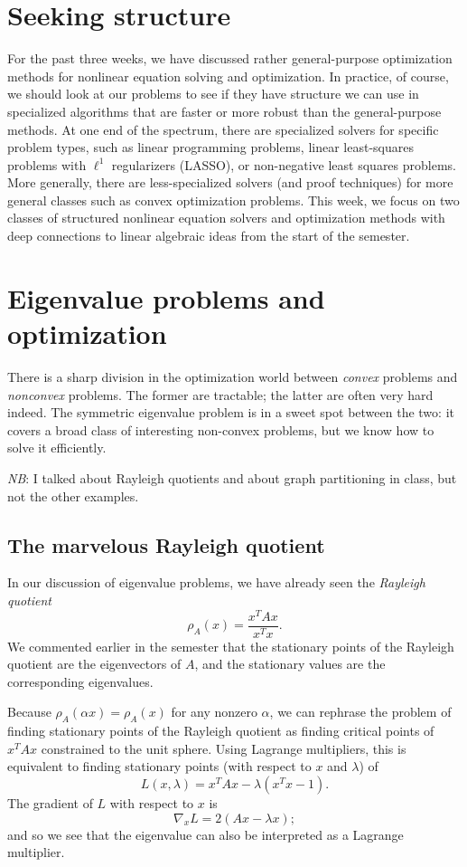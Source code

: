 \documentclass[12pt, leqno]{article} %
\begin{document}

\section*{Seeking structure}

For the past three weeks, we have discussed rather general-purpose
optimization methods for nonlinear equation solving and optimization.
In practice, of course, we should look at our problems to see if they
have structure we can use in specialized algorithms that are faster or
more robust than the general-purpose methods.  At one end of the
spectrum, there are specialized solvers for specific problem types,
such as linear programming problems, linear least-squares problems
with $\ell^1$ regularizers (LASSO), or non-negative least squares
problems.  More generally, there are less-specialized solvers (and
proof techniques) for more general classes such as convex optimization
problems.  This week, we focus on two classes of structured nonlinear
equation solvers and optimization methods with deep connections to
linear algebraic ideas from the start of the semester.

\section*{Eigenvalue problems and optimization}

There is a sharp division in the optimization world between
{\em convex} problems and {\em nonconvex} problems.  The former are
tractable; the latter are often very hard indeed.  The symmetric
eigenvalue problem is in a sweet spot between the two: it covers
a broad class of interesting non-convex problems, but we know how
to solve it efficiently.

{\em NB}: I talked about Rayleigh quotients and about graph
partitioning in class, but not the other examples.

\subsection*{The marvelous Rayleigh quotient}

In our discussion of eigenvalue problems, we have already seen
the {\em Rayleigh quotient}
\[
  \rho_A(x) = \frac{x^T A x}{x^T x}.
\]
We commented earlier in the semester that the stationary points
of the Rayleigh quotient are the eigenvectors of $A$, and the
stationary values are the corresponding eigenvalues.

Because $\rho_A(\alpha x) = \rho_A(x)$ for any nonzero $\alpha$,
we can rephrase the problem of finding stationary points of
the Rayleigh quotient as finding critical points of $x^T A x$
constrained to the unit sphere.  Using Lagrange multipliers,
this is equivalent to finding stationary points (with respect
to $x$ and $\lambda$) of
\[
  L(x,\lambda) = x^T A x - \lambda (x^T x - 1).
\]
The gradient of $L$ with respect to $x$ is
\[
  \nabla_x L = 2(Ax-\lambda x);
\]
and so we see that the eigenvalue can also be interpreted as a
Lagrange multiplier.
\end{document}
